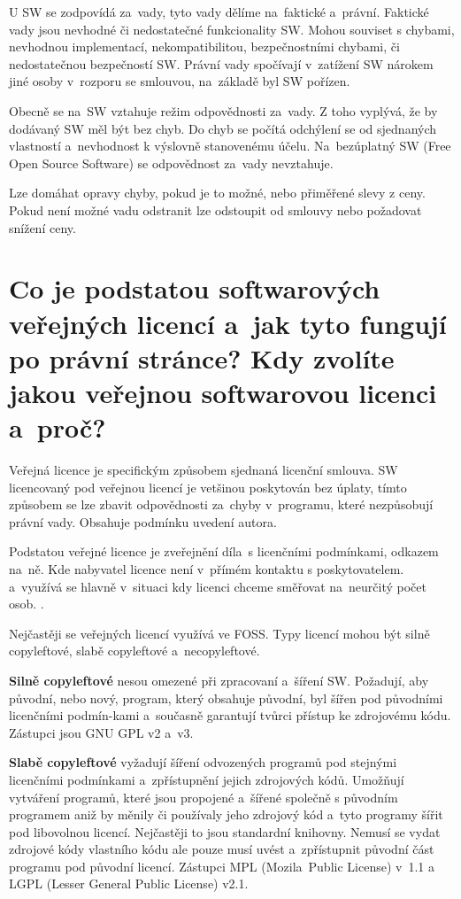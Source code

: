 U SW se zodpovídá za~vady, tyto vady dělíme na~faktické a~právní. Faktické vady jsou nevhodné či nedostatečné funkcionality SW\@. Mohou souviset s chybami, nevhodnou implementací, nekompatibilitou, bezpečnostními chybami, či nedostatečnou bezpečností SW\@. Právní vady spočívají v~zatížení SW nárokem jiné osoby v~rozporu se smlouvou, na~základě byl SW pořízen.

Obecně se na~SW vztahuje režim odpovědnosti za~vady. Z toho vyplývá, že by dodávaný SW měl být bez chyb. Do chyb se počítá odchýlení se od sjednaných vlastností a~nevhodnost k výslovně stanovenému účelu. Na~bezúplatný SW (Free Open Source Software) se odpovědnost za~vady nevztahuje.

Lze domáhat opravy chyby, pokud je to možné, nebo přiměřené slevy z ceny. Pokud není možné vadu odstranit lze odstoupit od smlouvy nebo požadovat snížení ceny.


\section{Co je podstatou softwarových veřejných licencí a~jak tyto fungují po právní stránce? Kdy zvolíte jakou veřejnou softwarovou licenci a~proč?}

Veřejná licence je specifickým způsobem sjednaná licenční smlouva. SW licencovaný pod veřejnou licencí je vetšinou poskytován bez úplaty, tímto způsobem se lze zbavit odpovědnosti za~chyby v~programu, které nezpůsobují právní vady. Obsahuje podmínku uvedení autora.

Podstatou veřejné licence je zveřejnění díla~s licenčními podmínkami, odkazem na~ně. Kde nabyvatel licence není v~přímém kontaktu s poskytovatelem. a~využívá se hlavně v~situaci kdy licenci chceme směřovat na~neurčitý počet osob. .

Nejčastěji se veřejných licencí využívá ve FOSS\@. Typy licencí mohou být silně copyleftové, slabě copyleftové a~necopyleftové.

\textbf{Silně copyleftové} nesou omezené při zpracovaní a~šíření SW\@. Požadují, aby původní, nebo nový, program, který obsahuje původní, byl šířen pod původními licenčními podmín-kami a~současně garantují tvůrci přístup ke zdrojovému kódu. Zástupci jsou GNU GPL v2 a~v3.

\textbf{Slabě copyleftové} vyžadují šíření odvozených programů pod stejnými licenčními podmínkami a~zpřístupnění jejich zdrojových kódů. Umožňují vytváření programů, které jsou propojené a~šířené společně s původním programem aniž by měnily či používaly jeho zdrojový kód a~tyto programy šířit pod libovolnou licencí. Nejčastěji to jsou standardní knihovny. Nemusí se vydat zdrojové kódy vlastního kódu ale pouze musí uvést a~zpřístupnit původní část programu pod původní licencí. Zástupci MPL (Mozila~Public License) v~1.1 a~ LGPL (Lesser General Public License) v2.1.

